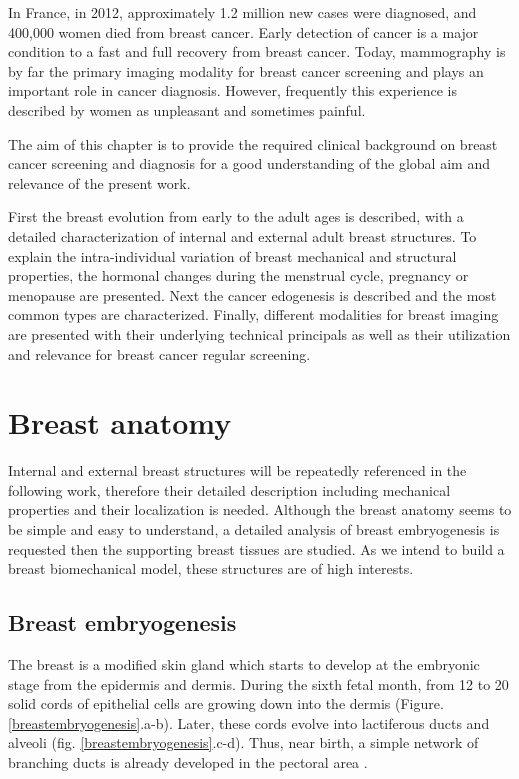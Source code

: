 
In France, in 2012, approximately 1.2 million new cases were diagnosed, and 400,000 women died from breast cancer. Early detection of cancer is a major condition to a fast and full recovery from breast cancer. Today, mammography is by far the primary imaging modality for breast cancer screening and plays an important role in cancer diagnosis. However, frequently this experience is described by women as unpleasant and sometimes painful.

The aim of this chapter is to provide the required clinical background on breast cancer screening and diagnosis for a good understanding of the global aim and relevance of the present work. 

First the breast evolution from early to the adult ages is described, with a detailed characterization of internal and external adult breast structures. To explain the intra-individual variation of breast mechanical and structural properties, the hormonal changes during the menstrual cycle, pregnancy or menopause are presented.   Next the cancer edogenesis is described and the most common types are characterized. Finally, different modalities for breast imaging are presented with their underlying technical principals as well as their utilization and relevance for breast cancer regular screening.

\clearpage
\section{Breast anatomy}\label{section:breastanatomy}

Internal and external breast structures will be repeatedly referenced in the following work, therefore their detailed description including mechanical properties and their localization is needed. Although the breast anatomy seems to be simple and easy to understand, a detailed analysis of breast embryogenesis is requested then the supporting breast tissues are studied. As we intend to build a breast biomechanical model, these structures are of high interests.  

  
\subsection{Breast embryogenesis}\label{subsection:breastembryogenesis}

The breast is a modified skin gland which starts to develop at the embryonic stage from the epidermis and dermis.  During the sixth fetal month, from 12 to 20 solid cords of epithelial cells are growing down into the dermis (Figure. \ref{breastembryogenesis}.a-b). Later, these cords evolve into lactiferous ducts and alveoli (fig. \ref{breastembryogenesis}.c-d). Thus, near birth, a simple network of branching ducts is already developed in the pectoral area \citep{skandalakis_embryology_2009}.
 

